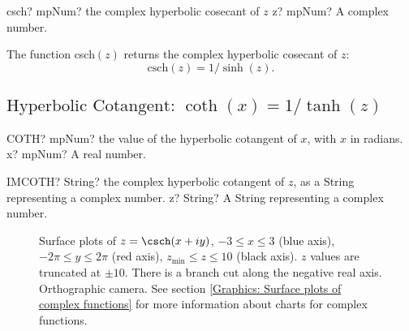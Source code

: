 \begin{mpFunctionsExtract}
	\mpFunctionOne
	{csch? mpNum? the complex hyperbolic cosecant of $z$}
	{z? mpNum? A complex number.}
\end{mpFunctionsExtract}

\vspace{0.3cm}
The function \textsf{csch$(z)$} returns the complex hyperbolic cosecant of $z$: 
\begin{equation}
	\text{csch}(z) = 1/\sinh(z).
\end{equation}



\newpage
\subsection{\texorpdfstring{$\text{Hyperbolic Cotangent: }\coth(x) = 1/\tanh(z)$}{coth}}

\begin{mpFunctionsExtract}
	\mpWorksheetFunctionOneNotImplemented
	{COTH? mpNum? the value of the hyperbolic cotangent of $x$, with $x$ in radians.}
	{x? mpNum? A real number.}
\end{mpFunctionsExtract}

\vspace{0.6cm}
\begin{mpFunctionsExtract}
	\mpWorksheetFunctionOneNotImplemented
	{IMCOTH? String? the complex hyperbolic cotangent of $z$, as a String representing a complex number.}
	{z? String? A String representing a complex number.}
\end{mpFunctionsExtract}


\begin{figure}[ht]%
	\centering
	\qquad
	\caption[Complex Hyperbolic Cotangent]{Surface plots of $z = \csch(x + iy)$, $-3 \leq x \leq 3$ (blue axis), $-2 \pi \leq y \leq 2\pi$ (red axis), $z_{\text{min}} \leq z \leq 10$ (black axis). $z$ values are truncated at $\pm 10$. There is a branch cut along the negative real axis. Orthographic camera. See section \ref{Graphics: Surface plots of complex functions} for more information about charts for complex functions.} 
	\label{fig:Complex Hyperbolic Cotangent}%
\end{figure}


